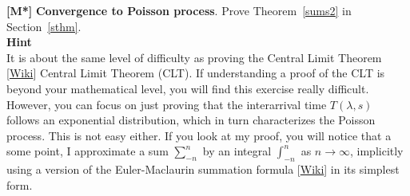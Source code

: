 \documentclass[10pt]{article}
\begin{document}
\begin{Exercise}\label{exercise3}
{\bf [M*]} {\bf Convergence to Poisson process}. Prove Theorem~\ref{sums2} in Section~\ref{sthm}.\vspace{1ex} \\
{\bf Hint} \vspace{1ex} \\
It is about the same level of difficulty as proving the
\textcolor{index}{Central Limit Theorem} [\href{https://en.wikipedia.org/wiki/Central_limit_theorem}{Wiki}]
Central Limit Theorem (CLT). If understanding a proof of the CLT is beyond your mathematical level, you will find this exercise really difficult. However, you can focus on just proving that the interarrival time $T(\lambda,s)$ follows an exponential distribution, which in turn characterizes the Poisson process. This is not easy either. If you look at my proof, you will notice that a some point, I approximate a sum $\sum_{-n}^n$ by an integral $\int_{-n}^n$ as $n\rightarrow\infty$, implicitly using a version of the Euler-Maclaurin summation formula [\href{https://bit.ly/3m7FxKA}{Wiki}] in its simplest form.
\end{Exercise}
\end{document}
